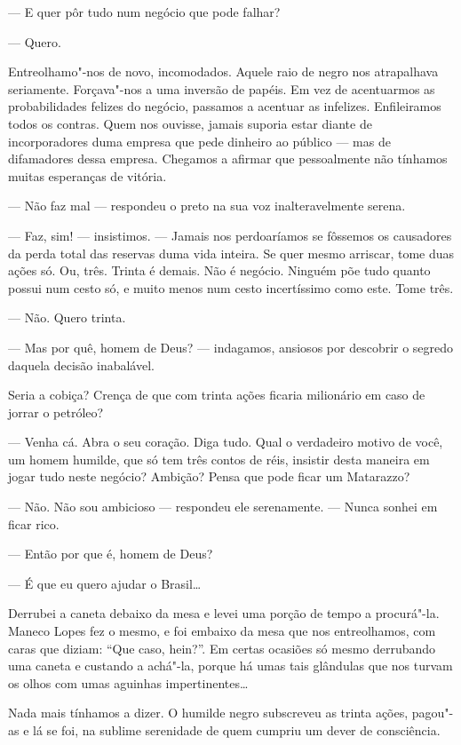 --- E quer pôr tudo num negócio que pode falhar?

--- Quero.

Entreolhamo"-nos de novo, incomodados. Aquele raio de negro nos
atrapalhava seriamente. Forçava"-nos a uma inversão de papéis. Em vez de
acentuarmos as probabilidades felizes do negócio, passamos a acentuar as
infelizes. Enfileiramos todos os contras. Quem nos ouvisse, jamais
suporia estar diante de incorporadores duma empresa que pede dinheiro ao
público --- mas de difamadores dessa empresa. Chegamos a afirmar que
pessoalmente não tínhamos muitas esperanças de vitória.

--- Não faz mal --- respondeu o preto na sua voz inalteravelmente
serena.

--- Faz, sim! --- insistimos. --- Jamais nos perdoaríamos se fôssemos os
causadores da perda total das reservas duma vida inteira. Se quer mesmo
arriscar, tome duas ações só. Ou, três. Trinta é demais. Não é negócio.
Ninguém põe tudo quanto possui num cesto só, e muito menos num cesto
incertíssimo como este. Tome três.

--- Não. Quero trinta.

--- Mas por quê, homem de Deus? --- indagamos, ansiosos por descobrir o
segredo daquela decisão inabalável.

Seria a cobiça? Crença de que com trinta ações ficaria milionário em
caso de jorrar o petróleo?

--- Venha cá. Abra o seu coração. Diga tudo. Qual o verdadeiro motivo de
você, um homem humilde, que só tem três contos de réis, insistir desta
maneira em jogar tudo neste negócio? Ambição? Pensa que pode ficar um
Matarazzo?

--- Não. Não sou ambicioso --- respondeu ele serenamente. --- Nunca
sonhei em ficar rico.

--- Então por que é, homem de Deus?

--- É que eu quero ajudar o Brasil\ldots{}

Derrubei a caneta debaixo da mesa e levei uma porção de tempo a
procurá"-la. Maneco Lopes fez o mesmo, e foi embaixo da mesa que nos
entreolhamos, com caras que diziam: ``Que caso, hein?''. Em certas
ocasiões só mesmo derrubando uma caneta e custando a achá"-la, porque há
umas tais glândulas que nos turvam os olhos com umas aguinhas
impertinentes\ldots{}

Nada mais tínhamos a dizer. O humilde negro subscreveu as trinta ações,
pagou"-as e lá se foi, na sublime serenidade de quem cumpriu um dever de
consciência.

